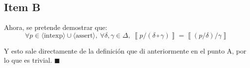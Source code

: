 \documentclass{article}
\newcommand{\aexp}[1]{\langle\text{#1}\rangle}
\newcommand{\intexp}{\aexp{intexp}}
\newcommand{\assert}{\aexp{assert}}
\newcommand{\sem}[1]{\left\llbracket #1\right\rrbracket}
\begin{document}
\subsection*{Item B}
Ahora, se pretende demostrar que:
\begin{equation*}
	\forall p \in \intexp \cup \assert,\ \forall \delta, \gamma \in \Delta,\ \sem{p/(\delta \circ \gamma)} = \sem{(p/\delta)/\gamma}
\end{equation*}

Y esto sale directamente de la definición que di anteriormente en el punto A, por lo que es trivial. $\blacksquare$
\end{document}
